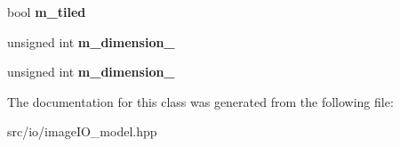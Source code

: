 \begin{DoxyCompactItemize}
\item 
\hypertarget{classutk_1_1PointsetIllustrator__Model_ace8bf585fb5c83af95486f24d7b1615d}{bool {\bfseries m\-\_\-tiled}}\label{classutk_1_1PointsetIllustrator__Model_ace8bf585fb5c83af95486f24d7b1615d}

\item 
\hypertarget{classutk_1_1PointsetIllustrator__Model_a4eae51f3edca8dd1000c24a1883ac076}{unsigned int {\bfseries m\-\_\-dimension\-\_}}\label{classutk_1_1PointsetIllustrator__Model_a4eae51f3edca8dd1000c24a1883ac076}

\item 
\hypertarget{classutk_1_1PointsetIllustrator__Model_add694b5a8e28d52a3903150d6c1b8740}{unsigned int {\bfseries m\-\_\-dimension\-\_}}\label{classutk_1_1PointsetIllustrator__Model_add694b5a8e28d52a3903150d6c1b8740}

\end{DoxyCompactItemize}


The documentation for this class was generated from the following file\-:\begin{DoxyCompactItemize}
\item 
src/io/image\-I\-O\-\_\-model.\-hpp\end{DoxyCompactItemize}
